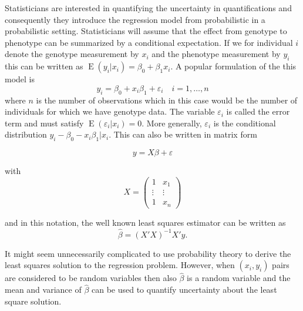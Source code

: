 \documentclass[final,leqno]{siamltex1213}
\DeclareMathOperator{\E}{E}
\begin{document}
Statisticians are interested in quantifying the uncertainty in quantifications and consequently they introduce the regression model from probabilistic in a probabilistic setting. Statisticians will assume that the effect from genotype to phenotype can be summarized by a conditional expectation. If we for individual $i$ denote the genotype measurement by $x_i$ and the phenotype measurement by $y_i$ this can be written as $\E(y_i|x_i)=\beta_0 + \beta_1 x_i$. A popular formulation of the this model is
\begin{equation*}
    y_i = \beta_0 + x_i \beta_1 + \varepsilon_i\quad i=1,\dots,n
\end{equation*}
where $n$ is the number of observations which in this case would be the number of individuals for which we have genotype data. The variable $\varepsilon_i$ is called the error term and must satisfy $\E(\varepsilon_i|x_i)=0$. More generally, $\varepsilon_i$ is the conditional distribution $y_i - \beta_0 - x_i\beta_1|x_i$. This can also be written in matrix form

\begin{equation}
\label{eq:linreg}
    y = X\beta + \varepsilon
\end{equation}

with
\begin{equation*}
    X = \begin{pmatrix}
        1 & x_1\\
        \vdots & \vdots \\
        1 & x_n
    \end{pmatrix}
\end{equation*}

and in this notation, the well known least squares estimator can be written as
\begin{equation}
\label{eq:ols}
    \hat{\beta} = (X'X)^{-1}X'y.
\end{equation}

It might seem unnecessarily complicated to use probability theory to derive the least squares solution to the regression problem. However, when $(x_i,y_i)$ pairs are considered to be random variables then also $\hat{\beta}$ is a random variable and the mean and variance of $\hat{\beta}$ can be used to quantify uncertainty about the least square solution.
\end{document}
